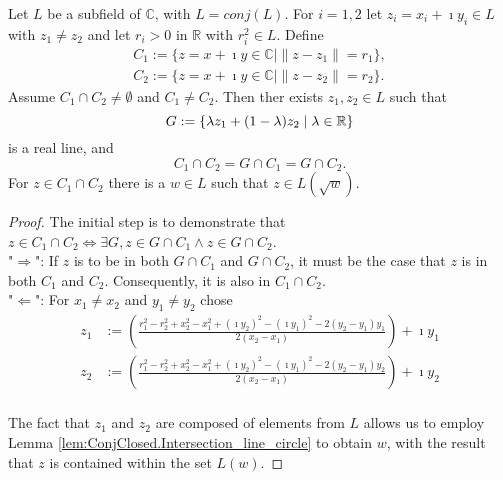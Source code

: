 \begin{lemma}
    \label{lem:ConjClosed.Intersection_circle_circle}
    Let $L$ be a subfield of $\mathbb{C}$, with $L = conj(L)$. For $i = 1,2 $ let $z_i = x_i + \imath y_i \in L$ with $z_1 \ne z_2$ and let $r_i > 0$ in $\mathbb{R}$ with $r_i^2 \in L$. Define
    \begin{equation*} \begin{aligned}
        C_1 := \{z = x + \imath y \in \mathbb{C} \mid \|z - z_1\| = r_1\},\\
        C_2 := \{z = x + \imath y \in \mathbb{C} \mid \|z - z_2\| = r_2\}.
    \end{aligned} \end{equation*}
    Assume $C_1 \cap C_2 \ne \emptyset$ and $C_1 \ne C_2$. Then  ther  exists $z_1, z_2 \in L$ such that
     $$G := \{ \lambda z_1 + (1-\lambda) z_2 \mid \lambda \in \mathbb{R} \}$$ %
    is a real line, and $$ C_1 \cap C_2 = G \cap C_1 = G \cap C_2. $$
    For $z \in C_1 \cap C_2$ there is a $w \in L$ such that $z \in L(\sqrt{w})$.
\end{lemma}
\begin{proof}
    The initial step is to demonstrate that $ z\in C_1 \cap C_2 \Leftrightarrow \exists G,  z\in G \cap C_1 \land z \in G \cap C_2$.\\
    "$\Rightarrow$": If $z$ is to be in both $G \cap C_1$ and $G \cap C_2$, it must be the case that $z$ is in both $C_1$ and $C_2$. Consequently, it is also in $C_1 \cap C_2$. \\
    "$\Leftarrow$": For $ x_1 \ne x_2$ and $y_1 \ne y_2$ chose 
        \begin{align*}
            z_1 &:= (\frac{r_1^2 - r_2^2 + x_2^2 - x_1^2 + (\imath y_2)^2 - (\imath y_1)^2-2(y_2-y_1)y_1}{2(x_2-x_1)}) + \imath y_1\\ %
            z_2 &:= (\frac{r_1^2 - r_2^2 + x_2^2 - x_1^2 + (\imath y_2)^2 - (\imath y_1)^2-2(y_2-y_1)y_2}{2(x_2-x_1)}) + \imath y_2\\
        \end{align*}

    The fact that $z_1$ and $z_2$ are composed of elements from $L$ allows us to employ Lemma \ref{lem:ConjClosed.Intersection_line_circle} to obtain $w$, with the result that $z$ is contained within the set $L(w)$.
\end{proof}

